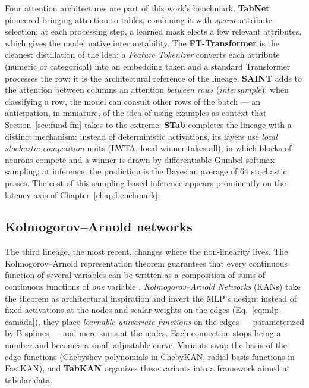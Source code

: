 Four attention architectures are part of this work's benchmark.
\textbf{TabNet} \citep{arik2021} pioneered bringing attention to
tables, combining it with \emph{sparse} attribute selection: at each
processing step, a learned mask elects a few relevant attributes,
which gives the model native interpretability. The
\textbf{FT-Transformer} \citep{gorishniy2021} is the cleanest
distillation of the idea: a \emph{Feature Tokenizer} converts each
attribute (numeric or categorical) into an embedding token and a
standard Transformer processes the row; it is the architectural
reference of the lineage. \textbf{SAINT} \citep{somepalli2021} adds
to the attention between columns an attention \emph{between rows}
(\emph{intersample}): when classifying a row, the model can consult
other rows of the batch --- an anticipation, in miniature, of the
idea of using examples as context that Section~\ref{sec:fund-fm}
takes to the extreme. \textbf{STab} \citep{stab-ref} completes the
lineage with a distinct mechanism: instead of deterministic
activations, its layers use \emph{local stochastic competition}
units (LWTA, local winner-takes-all), in which blocks of neurons
compete and a winner is drawn by differentiable Gumbel-softmax
sampling; at inference, the prediction is the Bayesian average of 64
stochastic passes. The cost of this sampling-based inference appears
prominently on the latency axis of Chapter~\ref{chap:benchmark}.

\subsection{Kolmogorov--Arnold networks}

The third lineage, the most recent, changes where the non-linearity
lives. The Kolmogorov--Arnold representation theorem guarantees that
every continuous function of several variables can be written as a
composition of sums of continuous functions of \emph{one} variable
\citep{kolmogorov1957,arnold1957}. \emph{Kolmogorov--Arnold
Networks} (KANs) \citep{kan2024} take the theorem as architectural
inspiration and invert the MLP's design: instead of fixed
activations at the nodes and scalar weights on the edges
(Eq.~\ref{eq:mlp-camada}), they place \emph{learnable univariate
functions} on the edges --- parameterized by B-splines --- and mere
sums at the nodes. Each connection stops being a number and becomes
a small adjustable curve. Variants swap the basis of the edge
functions (Chebyshev polynomials in ChebyKAN, radial basis functions
in FastKAN), and \textbf{TabKAN} \citep{tabkan2025} organizes these
variants into a framework aimed at tabular data.

